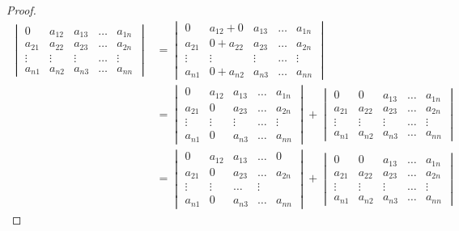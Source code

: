 \documentclass{book} %
\begin{document}
\begin{proof}
						\begin{align}
							\begin{vmatrix}
								0 & a_{1 2} & a_{1 3} & \dots & a_{1 n} \\
								a_{2 1} & a_{2 2} & a_{2 3} & \dots & a_{2 n} \\
								\vdots & \vdots & \vdots & \dots & \vdots \\
								a_{n 1} & a_{n 2} & a_{n 3} & \dots & a_{n n}
							\end{vmatrix}
							&= \begin{vmatrix}
								0 & a_{1 2} + 0 & a_{1 3} & \dots & a_{1 n} \\
								a_{2 1} & 0+ a_{2 2} & a_{2 3} & \dots & a_{2 n} \\
								\vdots & \vdots & \vdots & \dots & \vdots \\
								a_{n 1} & 0 + a_{n 2} & a_{n 3} & \dots & a_{n n}
							\end{vmatrix} \\
							&= \begin{vmatrix}
								0 & a_{1 2} & a_{1 3} & \dots & a_{1 n} \\
								a_{2 1}  & 0 & a_{2 3}& \dots & a_{2 n} \\
								\vdots & \vdots & \vdots & \dots & \vdots \\
								a_{n 1} & 0 & a_{n 3} & \dots & a_{n n}
							\end{vmatrix} 
							+
							\begin{vmatrix}
								0 & 0  & a_{1 3} & \dots & a_{1 n} \\
								a_{2 1} & a_{2 2} & a_{2 3} & \dots & a_{2 n} \\
								\vdots & \vdots & \vdots & \dots & \vdots \\
								a_{n 1} & a_{n 2} & a_{n 3} & \dots & a_{n n}
							\end{vmatrix} \\
							&= \begin{vmatrix}
								0 & a_{1 2} & a_{1 3} & \dots & 0 \\
								a_{2 1}  & 0 & a_{2 3} & \dots & a_{2 n} \\
								\vdots & \vdots & \dots & \vdots \\
								a_{n 1} & 0 & a_{n 3} & \dots & a_{n n}
							\end{vmatrix} 
							+
							\begin{vmatrix}
								0 & 0 & a_{1 3} &\dots & a_{1 n} \\
								a_{2 1} & a_{2 2} & a_{2 3} & \dots & a_{2 n} \\
								\vdots & \vdots & \vdots & \dots & \vdots \\
								a_{n 1} & a_{n 2} & a_{n 3} & \dots & a_{n n}
							\end{vmatrix}
						\end{align}
					

\end{proof}
\end{document}
